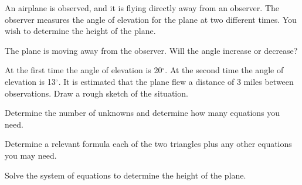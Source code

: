 \begin{problem}
  \clearpage

  \item An airplane is observed, and it is flying directly away from an observer.
    The observer measures the angle of elevation for the plane at two different
    times. You wish to determine the height of the plane.
    \begin{subproblem}
      \item The plane is moving away from the observer. Will the angle increase
        or decrease?
        \vspace{2em}
      \item At the first time the angle of elevation is 20$^\circ$.
        At the second time the angle of elevation is 13$^\circ$.
        It is estimated that the plane flew a distance of 3 miles between observations.
        Draw a rough sketch of the situation.
        \vfill
        \item Determine the number of unknowns and determine how many equations you need.
          \vspace{1em}
      \item Determine a relevant formula each of the two triangles plus any
        other equations you may need.
        \vfill
      \item Solve the system of equations to determine the height of the plane.
        \vfill
        \vfill
    \end{subproblem}

\end{problem}

\postClass

